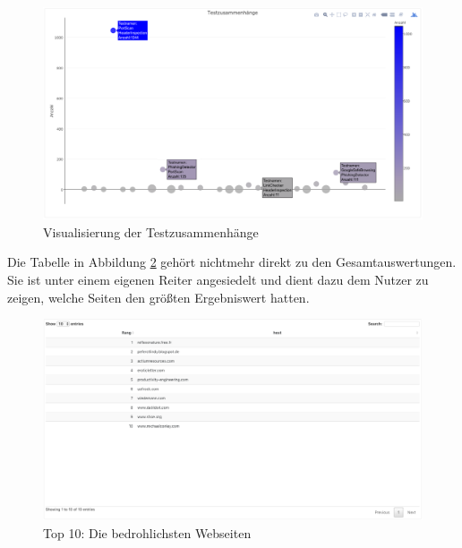 \begin{figure}[H]
  \centering
  \includegraphics[width=15cm]{images/stats/testzusammenhaenge}
  \caption{Visualisierung der Testzusammenhänge}
  \label{fig:testzusammenhaenge}
\end{figure}

Die Tabelle in Abbildung \ref{fig:top10} gehört nichtmehr direkt zu den Gesamtauswertungen. Sie ist unter einem eigenen Reiter angesiedelt und dient dazu dem Nutzer zu zeigen, welche Seiten den größten Ergebniswert hatten.
\begin{figure}[H]
  \centering
  \includegraphics[width=15cm]{images/stats/top10}
  \caption{Top 10: Die bedrohlichsten Webseiten}
  \label{fig:top10}
\end{figure}


